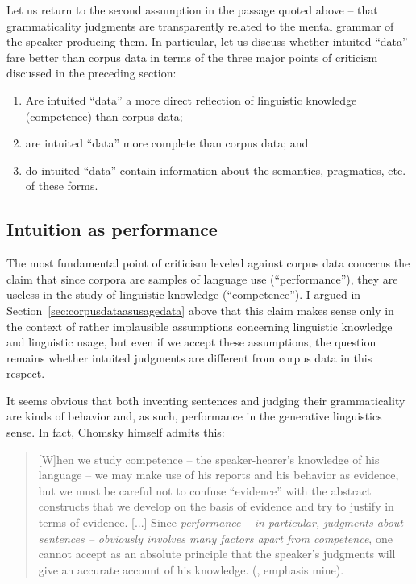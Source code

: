 Let us return to the second assumption in the passage quoted above -- that grammaticality  judgments are transparently related to the mental grammar of the speaker producing them. In particular, let us discuss whether intuited  ``data'' fare better than corpus data in terms of the three major points of criticism discussed in the preceding section:

\begin{enumerate}
\item Are intuited ``data'' a more direct reflection of linguistic knowledge (competence)  than corpus data;
\item are intuited  ``data'' more complete than corpus data; and
\item do intuited ``data'' contain information about the semantics,  pragmatics,  etc. of these forms.
\end{enumerate}

\subsection{Intuition as performance}
\label{sec:intuitionasperformance}

The most fundamental point of criticism leveled against corpus data concerns the claim that since corpora are samples of language use (``performance''),  they are useless in the study of linguistic knowledge (``competence'').  I argued in Section~\ref{sec:corpusdataasusagedata} above that this claim makes sense only in the context of rather implausible assumptions concerning linguistic knowledge and linguistic usage, but even if we accept these assumptions, the question remains whether intuited  judgments are different from corpus data in this respect.

It seems obvious that both inventing sentences and judging their grammaticality  are kinds of behavior and, as such, performance  in the generative  linguistics sense. In fact, Chomsky himself admits this:

\begin{quote}
[W]hen we study competence  -- the speaker\hyp{}hearer's knowledge of his language -- we may make use of his reports and his behavior as evidence, but we must be careful not to confuse ``evidence'' with the abstract constructs that we develop on the basis of evidence and try to justify in terms of evidence. [...] Since \emph{performance -- in particular, judgments about sentences -- obviously involves many factors apart from competence}, one cannot accept as an absolute principle that the speaker's judgments will give an accurate account of his knowledge. (\citealt[187]{chomsky_language_1972}, emphasis mine).
\end{quote}

